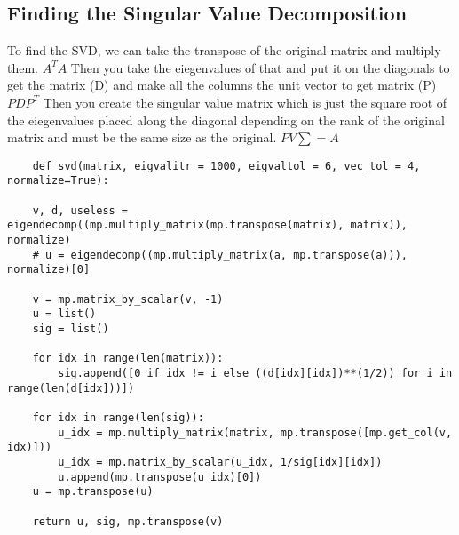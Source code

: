 \documentclass[12pt, a4paper]{article}
\begin{document}
\subsection{Finding the Singular Value Decomposition}

To find the SVD, we can take the transpose of the original matrix and multiply them. 
$A^{T}A$ 
Then you take the eiegenvalues of that and put it on the diagonals to get the matrix (D) and make all the columns the unit vector to get matrix (P) 
$PDP^{T}$
Then you create the singular value matrix which is just the square root of the eiegenvalues placed along the diagonal depending on the rank of the original matrix and must be the same size as the original.
$PV\sum=A $

\begin{lstlisting}
    def svd(matrix, eigvalitr = 1000, eigvaltol = 6, vec_tol = 4, normalize=True):

    v, d, useless = eigendecomp((mp.multiply_matrix(mp.transpose(matrix), matrix)), normalize)
    # u = eigendecomp((mp.multiply_matrix(a, mp.transpose(a))), normalize)[0]

    v = mp.matrix_by_scalar(v, -1)
    u = list()
    sig = list()

    for idx in range(len(matrix)):
        sig.append([0 if idx != i else ((d[idx][idx])**(1/2)) for i in range(len(d[idx]))])
    
    for idx in range(len(sig)):
        u_idx = mp.multiply_matrix(matrix, mp.transpose([mp.get_col(v, idx)]))
        u_idx = mp.matrix_by_scalar(u_idx, 1/sig[idx][idx])
        u.append(mp.transpose(u_idx)[0])
    u = mp.transpose(u)

    return u, sig, mp.transpose(v)
\end{lstlisting}
\end{document}
